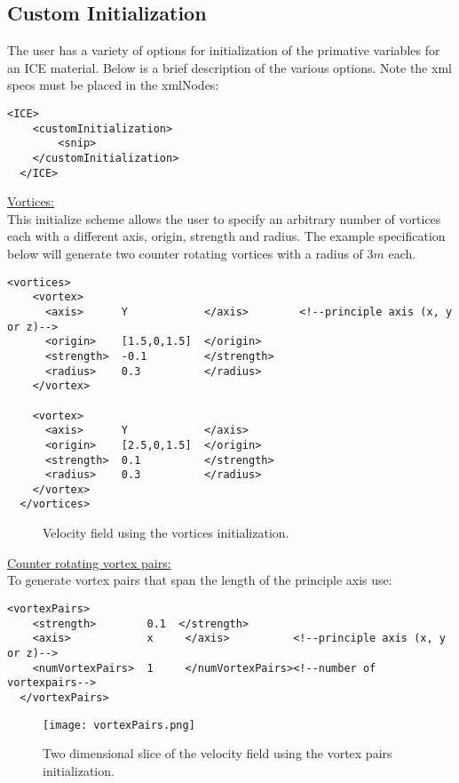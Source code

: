 \subsection{Custom Initialization}
The user has a variety of options for initialization of the primative variables for an ICE material.  Below is a brief description of the various options.  Note the xml specs must be placed in the xmlNodes: 
%
\begin{Verbatim}[fontsize=\footnotesize]
  <ICE>
    <customInitialization>
        <snip>
    </customInitialization>
  </ICE>
\end{Verbatim}
\underline{Vortices:}\\
This initialize scheme allows the user to specify an arbitrary number of vortices each with a different axis, origin, strength and radius.  The example  specification below will generate two counter rotating vortices with a radius of $3m$ each.
%
\begin{Verbatim}[fontsize=\footnotesize]
  <vortices>
    <vortex>
      <axis>      Y            </axis>        <!--principle axis (x, y or z)-->
      <origin>    [1.5,0,1.5]  </origin>
      <strength>  -0.1         </strength>
      <radius>    0.3          </radius>
    </vortex>

    <vortex>
      <axis>      Y            </axis>
      <origin>    [2.5,0,1.5]  </origin>
      <strength>  0.1          </strength>
      <radius>    0.3          </radius>
    </vortex>
  </vortices>                              
\end{Verbatim} 
%
\begin{figure}[h]
  \centering
  \caption{ Velocity field using the vortices initialization. }
  \label{fig:Poiseuille}
\end{figure}
%
% 
\underline{Counter rotating vortex pairs:}\\
To generate vortex pairs that span the length of the principle axis use:
%
\begin{Verbatim}[fontsize=\footnotesize]
  <vortexPairs>                                        
    <strength>        0.1  </strength>
    <axis>            x     </axis>          <!--principle axis (x, y or z)-->
    <numVortexPairs>  1     </numVortexPairs><!--number of vortexpairs-->
  </vortexPairs>                                  
\end{Verbatim} 
%
\begin{figure}[h]
  \centering
  \texttt{[image: vortexPairs.png]}
  \caption{ Two dimensional slice of the velocity field using the vortex pairs initialization. }
  \label{fig:Poiseuille}
\end{figure}
%



